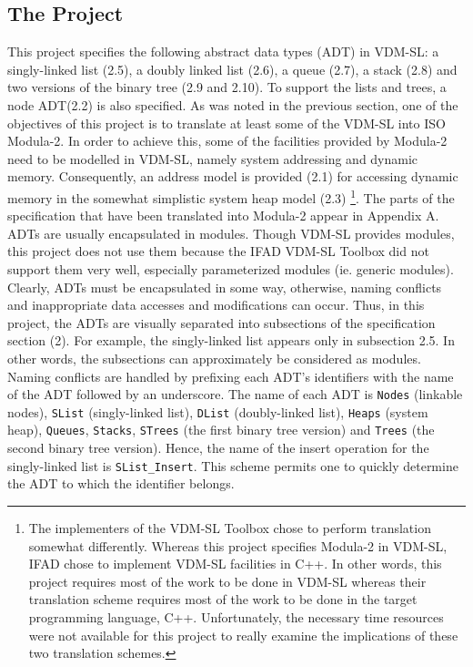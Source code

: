 \documentclass[11pt]{article}
\begin{document}
\subsection{The Project}
This project specifies the following abstract data types (ADT) in VDM-SL:  a singly-linked list (2.5), a doubly linked list (2.6), a queue (2.7), a stack (2.8) and two versions of the binary tree (2.9 and 2.10).  To support the lists and trees, a node ADT(2.2) is also specified.  As was noted in the previous section, one of the objectives of this project is to translate at least some of the VDM-SL into ISO Modula-2.  In order to achieve this, some of the facilities provided by Modula-2 need to be modelled in VDM-SL, namely system addressing and dynamic memory.  Consequently, an address model is provided (2.1) for accessing dynamic memory in the somewhat simplistic system heap model (2.3) \footnote{The implementers of the VDM-SL Toolbox chose to perform translation somewhat differently.  Whereas this project specifies Modula-2 in VDM-SL, IFAD chose to implement VDM-SL facilities in C++.  In other words, this project requires most of the work to be done in VDM-SL whereas their translation scheme requires most of the work to be done in the target programming language, C++.  Unfortunately, the necessary time resources were not available for this project to really examine the implications of these two translation schemes.}.  The parts of the specification that have been translated into Modula-2 appear in Appendix A.  \\

ADTs are usually encapsulated in modules.  Though VDM-SL provides modules, this project does not use them because the IFAD VDM-SL Toolbox did not support them very well, especially parameterized modules (ie. generic modules).  Clearly, ADTs must be encapsulated in some way, otherwise, naming conflicts and inappropriate data accesses and modifications can occur.  Thus, in this project, the ADTs are visually separated into subsections of the specification section (2).  For example, the singly-linked list appears only in subsection 2.5.  In other words, the subsections can approximately be considered as modules.  Naming conflicts are handled by prefixing each ADT's identifiers with the name of the ADT followed by an underscore.  The name of each ADT is {\tt Nodes} (linkable nodes),  {\tt SList} (singly-linked list), {\tt DList} (doubly-linked list), {\tt Heaps} (system heap), {\tt Queues}, {\tt Stacks}, {\tt STrees} (the first binary tree version) and {\tt Trees} (the second binary tree version).  Hence, the name of the insert operation for the singly-linked list is {\tt SList\_Insert}.  This scheme permits one to quickly determine the ADT to which the identifier belongs.\\
\end{document}
